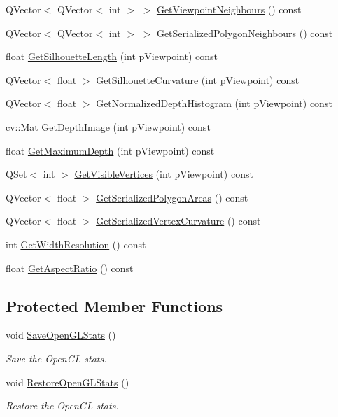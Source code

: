 \begin{DoxyCompactItemize}
Q\+Vector$<$ Q\+Vector$<$ int $>$ $>$ \hyperlink{class_scene_information_builder_a12bbb307743d659fe305b353fc38ec70}{Get\+Viewpoint\+Neighbours} () const 
\item 
Q\+Vector$<$ Q\+Vector$<$ int $>$ $>$ \hyperlink{class_scene_information_builder_ab00771802a6f00d4afb69df644db23aa}{Get\+Serialized\+Polygon\+Neighbours} () const 
\item 
float \hyperlink{class_scene_information_builder_aa5dda72577365fa2706d36baef55b424}{Get\+Silhouette\+Length} (int p\+Viewpoint) const 
\item 
Q\+Vector$<$ float $>$ \hyperlink{class_scene_information_builder_a18a4645a2215622259ccc4a045206a20}{Get\+Silhouette\+Curvature} (int p\+Viewpoint) const 
\item 
Q\+Vector$<$ float $>$ \hyperlink{class_scene_information_builder_a96db74fab1f2b395eef29a393c56fe88}{Get\+Normalized\+Depth\+Histogram} (int p\+Viewpoint) const 
\item 
cv\+::\+Mat \hyperlink{class_scene_information_builder_a7b570eb3b2215b2dd86880b75ed79459}{Get\+Depth\+Image} (int p\+Viewpoint) const 
\item 
float \hyperlink{class_scene_information_builder_a34606d0c1188199bd86f0e90e868a6a3}{Get\+Maximum\+Depth} (int p\+Viewpoint) const 
\item 
Q\+Set$<$ int $>$ \hyperlink{class_scene_information_builder_a2a60a7e0238ea69397427be075046240}{Get\+Visible\+Vertices} (int p\+Viewpoint) const 
\item 
Q\+Vector$<$ float $>$ \hyperlink{class_scene_information_builder_a92875a84898f024cfb0b2bf0c5703c33}{Get\+Serialized\+Polygon\+Areas} () const 
\item 
Q\+Vector$<$ float $>$ \hyperlink{class_scene_information_builder_a7c6f86788571aebe23247d5251de52b7}{Get\+Serialized\+Vertex\+Curvature} () const 
\item 
int \hyperlink{class_scene_information_builder_a5805bf870e07a2225e819b0ec5d2c12a}{Get\+Width\+Resolution} () const 
\item 
float \hyperlink{class_scene_information_builder_a08583e589c63460dd4149a3704eee4eb}{Get\+Aspect\+Ratio} () const 
\end{DoxyCompactItemize}
\subsection*{Protected Member Functions}
\begin{DoxyCompactItemize}
\item 
void \hyperlink{class_scene_information_builder_a0a13a8c58770f387cfe4c3262bc6467d}{Save\+Open\+G\+L\+Stats} ()
\begin{DoxyCompactList}\small\item\em Save the Open\+G\+L stats. \end{DoxyCompactList}\item 
void \hyperlink{class_scene_information_builder_ab46a20d6173bd1628c1ef472eb4afb6b}{Restore\+Open\+G\+L\+Stats} ()
\begin{DoxyCompactList}\small\item\em Restore the Open\+G\+L stats. \end{DoxyCompactList}\end{DoxyCompactItemize}
